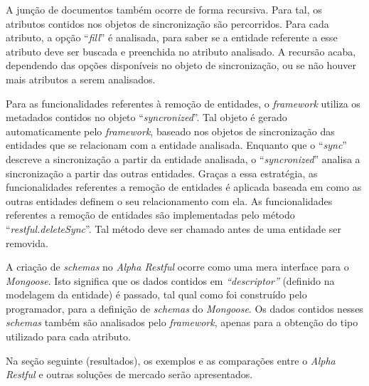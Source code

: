 A junção de documentos também ocorre de forma recursiva. Para tal, os atributos contidos nos objetos de sincronização são percorridos. Para cada atributo, a opção ``\textit{fill}'' é analisada, para saber se a entidade referente a esse atributo deve ser buscada e preenchida no atributo analisado. A recursão acaba, dependendo das opções disponíveis no objeto de sincronização, ou se não houver mais atributos a serem analisados.

Para as funcionalidades referentes à remoção de entidades, o \textit{framework} utiliza os metadados contidos no objeto ``\textit{syncronized}''. Tal objeto é gerado automaticamente pelo \textit{framework}, baseado nos objetos de sincronização das entidades que se relacionam com a entidade analisada. Enquanto que o ``\textit{sync}'' descreve a sincronização a partir da entidade analisada, o ``\textit{syncronized}'' analisa a sincronização a partir das outras entidades. Graças a essa estratégia, as funcionalidades referentes a remoção de entidades é aplicada baseada em como as outras entidades definem o seu relacionamento com ela. As funcionalidades referentes a remoção de entidades são implementadas pelo método ``\textit{restful.deleteSync}''. Tal método deve ser chamado antes de uma entidade ser removida.

A criação de \textit{schemas} no \textit{Alpha Restful} ocorre como uma mera interface para o \textit{Mongoose}. Isto significa que os dados contidos em \textit{``descriptor''} (definido na modelagem da entidade) é passado, tal qual como foi construído pelo programador, para a definição de \textit{schemas} do \textit{Mongoose}. Os dados contidos nesses \textit{schemas} também são analisados pelo \textit{framework}, apenas para a obtenção do tipo utilizado para cada atributo.

Na seção seguinte (resultados), os exemplos e as comparações entre o \textit{Alpha Restful} e outras soluções de mercado serão apresentados.



